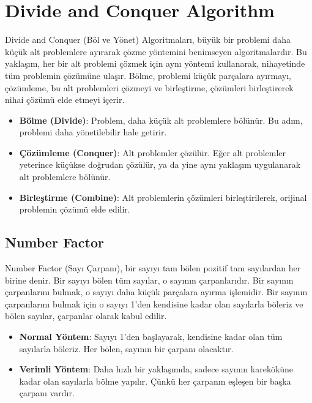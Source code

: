 \section{Divide and Conquer Algorithm}

Divide and Conquer (Böl ve Yönet) Algoritmaları, büyük bir problemi daha küçük alt problemlere ayırarak çözme yöntemini benimseyen algoritmalardır. Bu yaklaşım, her bir alt problemi çözmek için aynı yöntemi kullanarak, nihayetinde tüm problemin çözümüne ulaşır. Bölme, problemi küçük parçalara ayırmayı, çözümleme, bu alt problemleri çözmeyi ve birleştirme, çözümleri birleştirerek nihai çözümü elde etmeyi içerir.

\begin{itemize}
    \item \textbf{Bölme (Divide)}: Problem, daha küçük alt problemlere bölünür. Bu adım, problemi daha yönetilebilir hale getirir.
    \item \textbf{Çözümleme (Conquer)}: Alt problemler çözülür. Eğer alt problemler yeterince küçükse doğrudan çözülür, ya da yine aynı yaklaşım uygulanarak alt problemlere bölünür.
    \item \textbf{Birleştirme (Combine)}: Alt problemlerin çözümleri birleştirilerek, orijinal problemin çözümü elde edilir.
\end{itemize}

\newpage

\subsection{Number Factor}

Number Factor (Sayı Çarpanı), bir sayıyı tam bölen pozitif tam sayılardan her birine denir. Bir sayıyı bölen tüm sayılar, o sayının çarpanlarıdır. Bir sayının çarpanlarını bulmak, o sayıyı daha küçük parçalara ayırma işlemidir. Bir sayının çarpanlarını bulmak için o sayıyı 1'den kendisine kadar olan sayılarla böleriz ve bölen sayılar, çarpanlar olarak kabul edilir.

\begin{itemize}
    \item \textbf{Normal Yöntem}: Sayıyı 1'den başlayarak, kendisine kadar olan tüm sayılarla böleriz. Her bölen, sayının bir çarpanı olacaktır.
    \item \textbf{Verimli Yöntem}: Daha hızlı bir yaklaşımda, sadece sayının kareköküne kadar olan sayılarla bölme yapılır. Çünkü her çarpanın eşleşen bir başka çarpanı vardır.
\end{itemize}

